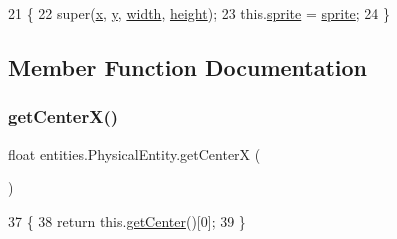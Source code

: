 \begin{DoxyCode}
21                                                                                      \{
22         super(\mbox{\hyperlink{classorg_1_1newdawn_1_1slick_1_1geom_1_1_shape_a3e985bfff386c15a4efaad03d8ad60d3}{x}}, \mbox{\hyperlink{classorg_1_1newdawn_1_1slick_1_1geom_1_1_shape_a9f934baded6a1b65ebb69e7e5f80ea00}{y}}, \mbox{\hyperlink{classorg_1_1newdawn_1_1slick_1_1geom_1_1_rectangle_a967e1823f62daf45abb142779d1be62d}{width}}, \mbox{\hyperlink{classorg_1_1newdawn_1_1slick_1_1geom_1_1_rectangle_a3bd010fdce636fc11ed0e0ad4d4b4a0a}{height}});
23         this.\mbox{\hyperlink{classentities_1_1_physical_entity_aeb439b2308ab19fb6d3ff6be6f7cdbd8}{sprite}} = \mbox{\hyperlink{classentities_1_1_physical_entity_aeb439b2308ab19fb6d3ff6be6f7cdbd8}{sprite}};
24     \}
\end{DoxyCode}


\subsection{Member Function Documentation}
\mbox{\label{classentities_1_1_physical_entity_ac084d1d2c3b6f810826b52ce42012a82}} 
\subsubsection{\texorpdfstring{get\+Center\+X()}{getCenterX()}}
{\footnotesize\ttfamily float entities.\+Physical\+Entity.\+get\+CenterX (\begin{DoxyParamCaption}{ }\end{DoxyParamCaption})\hspace{0.3cm}{\ttfamily [inline]}}


\begin{DoxyCode}
37                              \{
38         \textcolor{keywordflow}{return} this.\mbox{\hyperlink{classorg_1_1newdawn_1_1slick_1_1geom_1_1_shape_a1c413693dcdfc64cde4e604ccc930759}{getCenter}}()[0];
39     \}
\end{DoxyCode}
\mbox{\label{classentities_1_1_physical_entity_a5786e06f692199c9169b64eca2885683}} 
